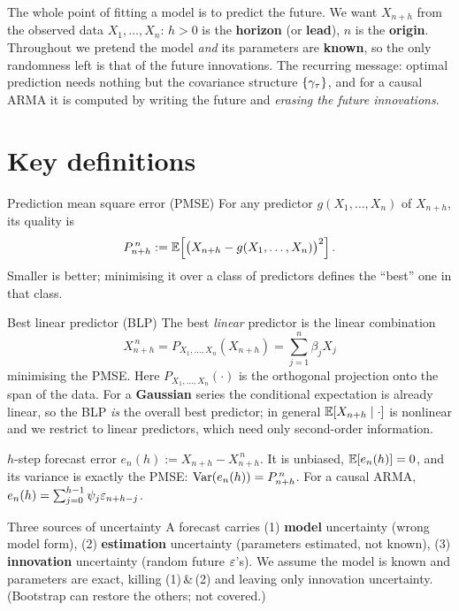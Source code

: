 \documentclass[11pt]{article}
\begin{document}

The whole point of fitting a model is to predict the future. We want $X_{n+h}$ from the
observed data $X_1,\dots,X_n$: $h>0$ is the \textbf{horizon} (or \textbf{lead}), $n$ is the
\textbf{origin}. Throughout we pretend the model \emph{and} its parameters are \textbf{known},
so the only randomness left is that of the future innovations. The recurring message: optimal
prediction needs nothing but the covariance structure $\{\gamma_\tau\}$, and for a causal ARMA
it is computed by writing the future and \emph{erasing the future innovations}.

\section*{Key definitions}

\begin{defn}{Prediction mean square error (PMSE)}
For any predictor $g(X_1,\dots,X_n)$ of $X_{n+h}$, its quality is
\[
P^{\,n}_{n+h}:=\mathbb{E}\!\left[\big(X_{n+h}-g(X_1,\dots,X_n)\big)^2\right].
\]
Smaller is better; minimising it over a class of predictors defines the ``best'' one in that class.
\end{defn}

\begin{defn}{Best linear predictor (BLP)}
The best \emph{linear} predictor is the linear combination
\[
X^{\,n}_{n+h}=P_{X_1,\dots,X_n}(X_{n+h})=\sum_{j=1}^{n}\beta_j X_j
\]
minimising the PMSE. Here $P_{X_1,\dots,X_n}(\cdot)$ is the orthogonal projection onto the
span of the data. For a \textbf{Gaussian} series the conditional expectation is already linear,
so the BLP \emph{is} the overall best predictor; in general $\mathbb{E}[X_{n+h}\mid\cdot]$ is nonlinear and
we restrict to linear predictors, which need only second-order information.
\end{defn}

\begin{defn}{$h$-step forecast error}
$e_n(h):=X_{n+h}-X^{\,n}_{n+h}$. It is unbiased, $\mathbb{E}[e_n(h)]=0$, and its variance is exactly the
PMSE: $\operatorname{Var}(e_n(h))=P^{\,n}_{n+h}$. For a causal ARMA, $e_n(h)=\sum_{j=0}^{h-1}\psi_j\varepsilon_{n+h-j}$.
\end{defn}

\begin{defn}{Three sources of uncertainty}
A forecast carries (1) \textbf{model} uncertainty (wrong model form), (2) \textbf{estimation}
uncertainty (parameters estimated, not known), (3) \textbf{innovation} uncertainty (random future
$\varepsilon$'s). We assume the model is known and parameters are exact, killing (1)\,\&\,(2) and leaving
only innovation uncertainty. (Bootstrap can restore the others; not covered.)
\end{defn}
\end{document}
